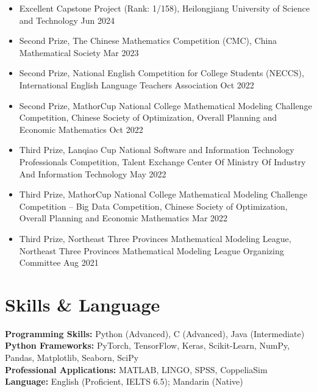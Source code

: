 \documentclass[10pt,a4paper]{article}
\begin{document}
\begin{itemize}
    \item Excellent Capstone Project (Rank: 1/158), Heilongjiang University of Science and Technology \hfill Jun 2024
    \item Second Prize, The Chinese Mathematics Competition (CMC), China Mathematical Society \hfill Mar 2023
    \item Second Prize, National English Competition for College Students (NECCS), International English Language Teachers Association \hfill Oct 2022
    \item Second Prize, MathorCup National College Mathematical Modeling Challenge Competition, Chinese Society of Optimization, Overall Planning and Economic Mathematics \hfill Oct 2022
    \item Third Prize, Lanqiao Cup National Software and Information Technology Professionals Competition, Talent Exchange Center Of Ministry Of Industry And Information Technology \hfill May 2022
    \item Third Prize, MathorCup National College Mathematical Modeling Challenge Competition -- Big Data Competition, Chinese Society of Optimization, Overall Planning and Economic Mathematics \hfill Mar 2022
    \item Third Prize, Northeast Three Provinces Mathematical Modeling League, Northeast Three Provinces Mathematical Modeling League Organizing Committee \hfill Aug 2021
\end{itemize}

\section*{Skills \& Language}

\textbf{Programming Skills:} Python (Advanced), C (Advanced), Java (Intermediate)\\
\textbf{Python Frameworks:} PyTorch, TensorFlow, Keras, Scikit-Learn, NumPy, Pandas, Matplotlib, Seaborn, SciPy\\
\textbf{Professional Applications:} MATLAB, LINGO, SPSS, CoppeliaSim\\
\textbf{Language:} English (Proficient, IELTS 6.5); Mandarin (Native)
\end{document}
